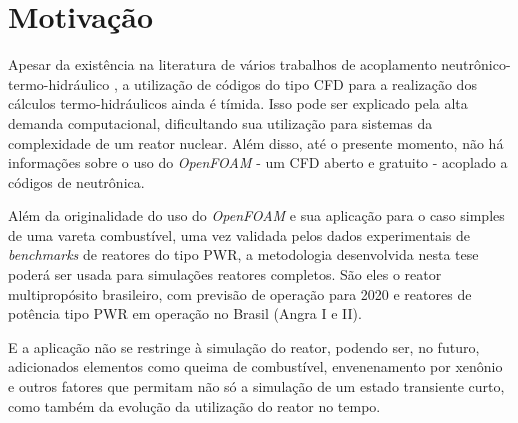 \section*{Motivação}

Apesar da existência na literatura de vários trabalhos de acoplamento neutrônico-termo-hidráulico \cite{Faghihi2011}, 
a utilização de códigos do tipo CFD para a realização dos cálculos 
termo-hidráulicos ainda é tímida. Isso pode ser explicado pela alta demanda
computacional, dificultando sua utilização para sistemas da complexidade de um
reator nuclear. Além disso, até o presente momento, não há
informações sobre o uso do \textit{OpenFOAM} - 
um CFD aberto e gratuito \cite{Jasak2007} - acoplado a códigos de neutrônica. 

Além da originalidade do uso do 
\textit{OpenFOAM} e sua aplicação para o caso simples de uma vareta combustível, uma vez validada pelos dados experimentais de \textit{benchmarks} de reatores
do tipo PWR\cite{benchmarksPWR}, a metodologia desenvolvida nesta tese poderá ser usada para simulações reatores completos. São eles o reator multipropósito brasileiro, com previsão de operação para 2020 e reatores de potência tipo PWR em operação no Brasil (Angra I e II). 

E a aplicação não se restringe à simulação do reator, podendo ser, no futuro, adicionados elementos como queima de combustível, envenenamento por xenônio e outros fatores que permitam não só a simulação de um estado transiente curto, como também da evolução da utilização do reator no tempo.
